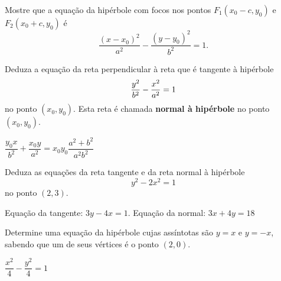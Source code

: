 \documentclass[12pt]{exam}
\begin{document}


\begin{exercicio}
    Mostre que a equação da hipérbole com focos nos pontos $F_1(x_0 - c, y_0)$ e $F_2(x_0 + c, y_0)$ é
    \[
        \dfrac{(x - x_0)^2}{a^2} - \dfrac{(y - y_0)^2}{b^2} = 1.
    \]
\end{exercicio}

\begin{exercicio}
    Deduza a equação da reta perpendicular à reta que é tangente à hipérbole
    \[
        \dfrac{y^2}{b^2} - \dfrac{x^2}{a^2} = 1
    \]
    no ponto $(x_0,y_0)$. Esta reta é chamada \textbf{normal à hipérbole} no ponto $(x_0,y_0)$.
    \begin{solucao}
        $\dfrac{y_0x}{b^2} + \dfrac{x_0y}{a^2} = x_0y_0\dfrac{a^2 + b^2}{a^2b^2}$
    \end{solucao}
\end{exercicio}

\begin{exercicio}
    Deduza as equações da reta tangente e da reta normal à hipérbole
    \[
        y^2 - 2x^2 = 1
    \]
    no ponto $(2,3)$.
    \begin{solucao}
        Equação da tangente: $3y - 4x = 1$. Equação da normal: $3x + 4y = 18$
    \end{solucao}
\end{exercicio}

\begin{exercicio}
    Determine uma equação da hipérbole cujas assíntotas são $y = x$ e $y = -x$, sabendo que um de seus vértices é o ponto $(2,0)$.
    \begin{solucao}
        $\dfrac{x^2}{4} - \dfrac{y^2}{4} = 1$
    \end{solucao}
\end{exercicio}
\end{document}
